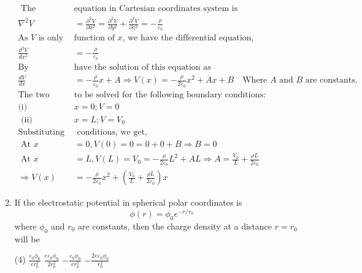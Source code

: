 \begin{enumerate}[label=\color{ocre}\textbf{\arabic*.}]
\begin{answer}
		\begin{align*}
		\text{ The Laplace's }&\text{equation in Cartesian coordinates system is}\\
		\nabla^{2} V&=\frac{\partial^{2} V}{\partial x^{2}}=\frac{\partial^{2} V}{\partial y^{2}}+\frac{\partial^{2} V}{\partial z^{2}}=-\frac{\rho}{\varepsilon_{0}}\\
		\text{As $V$ is only } &\text{function of $x$, we have the differential equation,}\\
		\frac{d^{2} V}{d x^{2}}&=-\frac{\rho}{\varepsilon_{0}}\\
		\text{By integrating we }&\text{have the solution of this equation as}\\
		\frac{d V}{d x}&=-\frac{\rho}{\varepsilon_{0}} x+A \Rightarrow V(x)=-\frac{\rho}{2 \varepsilon_{0}} x^{2}+A x+B \quad \text{Where $A$ and $B$ are constants.}\\
		\text{The two equations need }&\text{to be solved for the following boundary conditions:}\\
		\text{(i) }&x=0 ; V=0\\
		\text{	(ii)} &x=L ; V=V_{0}\\
		\text{Substituting these boundary }&\text{ conditions, we get,}\\
		\text { At } x&=0, V(0)=0=0+0+B \Rightarrow B=0 \\
		\text { At } x&=L, V(L)=V_{0}=-\frac{\rho}{2 \varepsilon_{0}} L^{2}+A L \Rightarrow A=\frac{V_{0}}{L}+\frac{\rho L}{2 \varepsilon_{0}}\\ \Rightarrow V(x)&=-\frac{\rho}{2 \varepsilon_{0}} x^{2}+\left(\frac{V_{0}}{L}+\frac{\rho L}{2 \varepsilon_{0}}\right) x
		\end{align*}
	\end{answer}
	\item If the electrostatic potential in spherical polar coordinates is
	$$
	\phi(r)=\phi_{0} e^{-r / r_{0}}
	$$
	where $\phi_{0}$ and $r_{0}$ are constants, then the charge density at a distance $r=r_{0}$ will be
	\begin{tasks}(4)
		\task[\textbf{a.}] $\frac{\varepsilon_{0} \phi_{0}}{e r_{0}^{2}}$  
		\task[\textbf{b.}]$\frac{e \varepsilon_{0} \phi_{0}}{2 r_{0}^{2}}$
		\task[\textbf{c.}]$-\frac{\varepsilon_{0} \phi_{0}}{e r_{0}^{2}}$ 
		\task[\textbf{d.}]$-\frac{2 e \varepsilon_{0} \phi_{0}}{r_{0}^{2}}$ 
	\end{tasks}
	

\end{enumerate}
